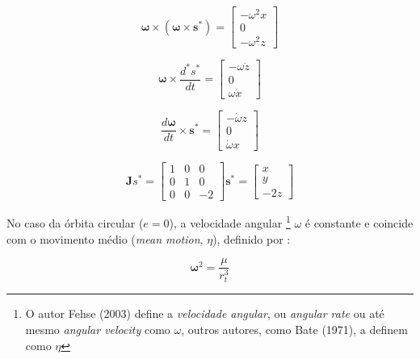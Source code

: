 \begin{equation}
\label{eq:velAngular_cross_cross_s}
\boldsymbol\omega \times (\boldsymbol\omega \times \boldsymbol s^*) =
\begin{bmatrix}
    -\omega^2 x \\
    0           \\
    -\omega^2 z 
\end{bmatrix}
\end{equation}

\begin{equation}
\label{eq:omega_cross_dsdt}
\boldsymbol\omega \times \frac{d^* s^*}{dt} =
\begin{bmatrix}
    -\omega \dot z \\
    0                 \\
    \omega \dot x
\end{bmatrix}
\end{equation}

\begin{equation}
\label{eq:dOmega_cross_s}
\frac{d\boldsymbol\omega}{dt} \times \boldsymbol s^* =
\begin{bmatrix}
    -\dot\omega z \\
    0              \\
    \dot\omega x
\end{bmatrix}
\end{equation}

\begin{equation}
\label{eq:jacobiana_LVLH}
\mathbf Js^* =
\begin{bmatrix}
    1 & 0 & 0 \\
    0 & 1 & 0  \\
    0 & 0 & -2
\end{bmatrix} \boldsymbol s^* =
\begin{bmatrix}
    x \\
    y \\
    -2z
\end{bmatrix}
\end{equation}

No caso da órbita circular ($e=0$), a velocidade angular
\footnote{O autor Fehse (2003) define a \emph{velocidade angular}, ou \emph{angular rate} ou até mesmo \emph{angular velocity} como $\omega$, outros autores, como Bate (1971), a definem como $\eta$} 
$\omega$ é constante e coincide com o movimento médio (\emph{mean motion}, $\eta$), definido por \cite{fehse2003}:

\begin{equation}
\label{eq:omega_constante}
\boldsymbol\omega^2 = \frac{\mu}{r_t^3}
\end{equation}

